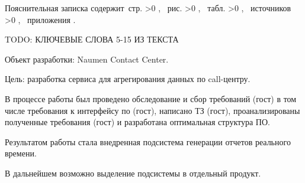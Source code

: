 \Referat

Пояснительная записка содержит \pageref{LastPage}\,стр.%
\ifnum \totfig >0
, \totfig~рис.%
\fi
\ifnum \tottab >0
, \tottab~табл.%
\fi
%
\ifnum \totbib >0
, \totbib~источников%
\fi
%
\ifnum \totapp >0
, \totapp~приложения%
\else
.%
\fi

TODO: КЛЮЧЕВЫЕ СЛОВА 5-15 ИЗ ТЕКСТА

Объект разработки: Naumen Contact Center.

Цель: разработка сервиса для агрегирования данных по call-центру.

В процессе работы был проведено обследование и сбор требований (гост) в том числе требования к интерфейсу по (гост),
написано ТЗ (гост), проанализированы полученные требования (гост) и разработана оптимальная структура ПО.

Результатом работы стала внедренная подсистема генерации отчетов реального времени.

В дальнейшем возможно выделение подсистемы в отдельный продукт.